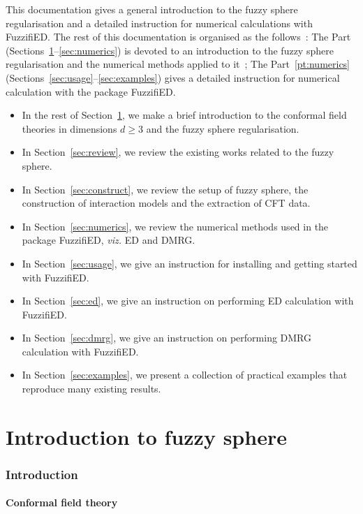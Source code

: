 \documentclass{timesjhep}
\begin{document}
This documentation gives a general introduction to the fuzzy sphere regularisation and a detailed instruction for numerical calculations with FuzzifiED. The rest of this documentation is organised as the follows~: The Part~\ref{pt:intro} (Sections~\ref{sec:intro}--\ref{sec:numerics}) is devoted to an introduction to the fuzzy sphere regularisation and the numerical methods applied to it~; The Part~\ref{pt:numerics} (Sections~\ref{sec:usage}--\ref{sec:examples}) gives a detailed instruction for numerical calculation with the package FuzzifiED. 
\begin{itemize}
    \item In the rest of Section~\ref{sec:intro}, we make a brief introduction to the conformal field theories in dimensions $d\ge 3$ and the fuzzy sphere regularisation. 
    \item In Section~\ref{sec:review}, we review the existing works related to the fuzzy sphere. 
    \item In Section~\ref{sec:construct}, we review the setup of fuzzy sphere, the construction of interaction models and the extraction of CFT data.
    \item In Section~\ref{sec:numerics}, we review the numerical methods used in the package FuzzifiED, \textit{viz.} ED and DMRG. 
    \item In Section~\ref{sec:usage}, we give an instruction for installing and getting started with FuzzifiED. 
    \item In Section~\ref{sec:ed}, we give an instruction on performing ED calculation with FuzzifiED. 
    \item In Section~\ref{sec:dmrg}, we give an instruction on performing DMRG calculation with FuzzifiED. 
    \item In Section~\ref{sec:examples}, we present a collection of practical examples that reproduce many existing results.
\end{itemize}

\clearpage
\part{Introduction to fuzzy sphere}
\label{pt:intro}

\section{Introduction}
\label{sec:intro}

\subsection{Conformal field theory}
\end{document}
